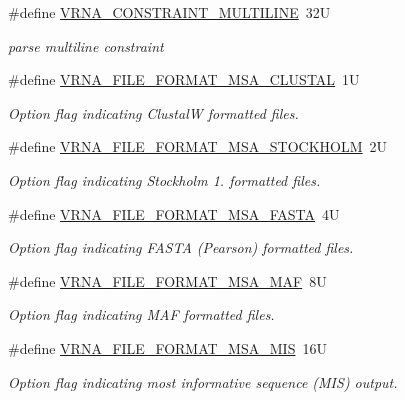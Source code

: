 \begin{DoxyCompactItemize}
\#define \hyperlink{group__file__utils_ga7d725ef525b29891abef3f1ed42599a4}{V\+R\+N\+A\+\_\+\+C\+O\+N\+S\+T\+R\+A\+I\+N\+T\+\_\+\+M\+U\+L\+T\+I\+L\+I\+NE}~32U
\begin{DoxyCompactList}\small\item\em parse multiline constraint \end{DoxyCompactList}\item 
\#define \hyperlink{group__file__utils_ga79a23de2c7249f2cccd762e475c81859}{V\+R\+N\+A\+\_\+\+F\+I\+L\+E\+\_\+\+F\+O\+R\+M\+A\+T\+\_\+\+M\+S\+A\+\_\+\+C\+L\+U\+S\+T\+AL}~1U
\begin{DoxyCompactList}\small\item\em Option flag indicating ClustalW formatted files. \end{DoxyCompactList}\item 
\#define \hyperlink{group__file__utils_ga62be992445cd8ab2ad7a8fded944338b}{V\+R\+N\+A\+\_\+\+F\+I\+L\+E\+\_\+\+F\+O\+R\+M\+A\+T\+\_\+\+M\+S\+A\+\_\+\+S\+T\+O\+C\+K\+H\+O\+LM}~2U
\begin{DoxyCompactList}\small\item\em Option flag indicating Stockholm 1. formatted files. \end{DoxyCompactList}\item 
\#define \hyperlink{group__file__utils_gacf6274a2c825f34e4131404665b00604}{V\+R\+N\+A\+\_\+\+F\+I\+L\+E\+\_\+\+F\+O\+R\+M\+A\+T\+\_\+\+M\+S\+A\+\_\+\+F\+A\+S\+TA}~4U
\begin{DoxyCompactList}\small\item\em Option flag indicating F\+A\+S\+TA (Pearson) formatted files. \end{DoxyCompactList}\item 
\#define \hyperlink{group__file__utils_gab3186d774c01570d2a47d0308eec4927}{V\+R\+N\+A\+\_\+\+F\+I\+L\+E\+\_\+\+F\+O\+R\+M\+A\+T\+\_\+\+M\+S\+A\+\_\+\+M\+AF}~8U
\begin{DoxyCompactList}\small\item\em Option flag indicating M\+AF formatted files. \end{DoxyCompactList}\item 
\#define \hyperlink{group__file__utils_ga494488a771aa0c602fb4cf445be34d47}{V\+R\+N\+A\+\_\+\+F\+I\+L\+E\+\_\+\+F\+O\+R\+M\+A\+T\+\_\+\+M\+S\+A\+\_\+\+M\+IS}~16U
\begin{DoxyCompactList}\small\item\em Option flag indicating most informative sequence (M\+IS) output. \end{DoxyCompactList}\item 

\end{DoxyCompactItemize}
